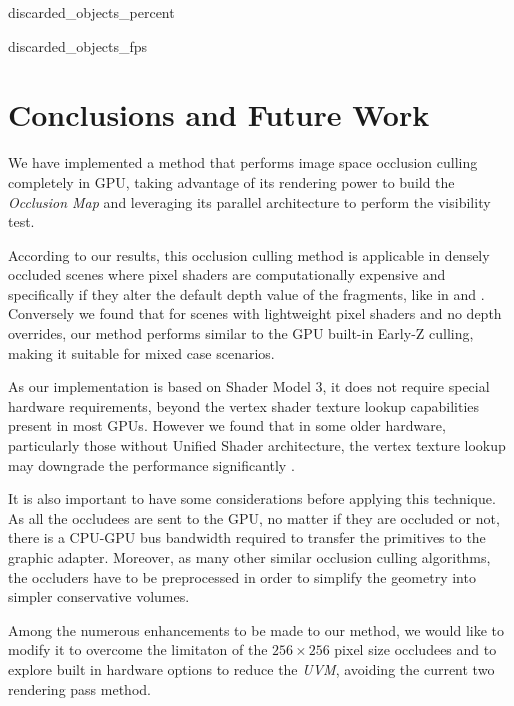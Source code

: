\documentclass[10pt, conference]{IEEEtran}
\begin{document}
{discarded_objects_percent}{
%
}


{discarded_objects_fps}{
%
}



\section{Conclusions and Future Work}
%
We have implemented a method that performs image space occlusion culling completely in GPU, taking advantage of its rendering power to 
build the \emph{Occlusion Map} and leveraging its parallel architecture to perform the visibility test.\

According to our results, this occlusion culling method is applicable in densely occluded scenes where pixel shaders are computationally 
expensive and specifically if they alter the default depth value of the fragments, like in \cite{z_correct_bump_1} and \cite{z_correct_bump_2}. 
Conversely we found that for scenes with lightweight pixel shaders and no depth overrides, our method performs similar to the GPU built-in Early-Z 
culling, making it suitable for mixed case scenarios.\

As our implementation is based on Shader Model 3, it does not require special hardware requirements, beyond the vertex shader texture lookup 
capabilities present in most GPUs. However we found that in some older hardware, particularly those without Unified Shader architecture, the vertex texture lookup may downgrade the performance significantly \cite{nv_programming_guide}.\

It is also important to have some considerations before applying this technique. 
As all the occludees are sent to the GPU, no matter if they are occluded or not, there is a CPU-GPU bus bandwidth required to transfer the primitives to the graphic adapter.
Moreover, as many other similar occlusion culling algorithms, the occluders have to be preprocessed in order to simplify the geometry into simpler conservative volumes.\
 
Among the numerous enhancements to be made to our method, we would like to modify it to overcome the limitaton of the 
$256 \times 256$ pixel size occludees and to explore built in hardware options to reduce the \emph{UVM}, avoiding the current two rendering pass method.\
\end{document}

